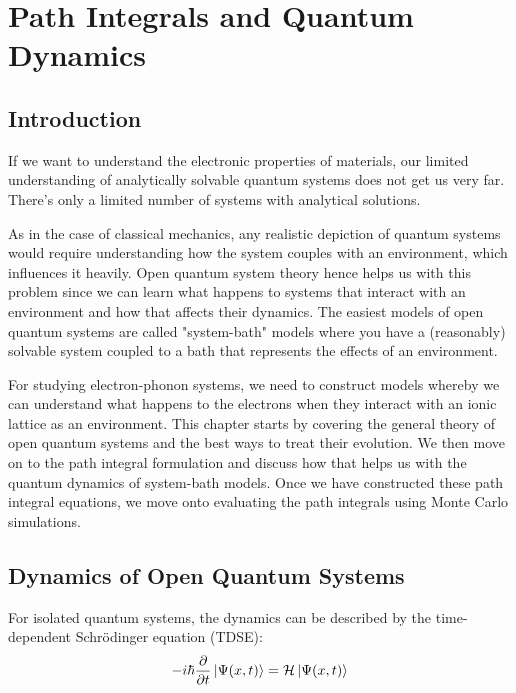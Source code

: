 \chapter{Path Integrals and Quantum Dynamics} %

\label{Chapter4} %



\section{Introduction}

If we want to understand the electronic properties of materials, our limited understanding of analytically solvable quantum systems does not get us very far. There's only a limited number of systems with analytical solutions.

As in the case of classical mechanics, any realistic depiction of quantum systems would require understanding how the system couples with an environment, which influences it heavily. Open quantum system theory hence helps us with this problem since we can learn what happens to systems that interact with an environment and how that affects their dynamics. The easiest models of open quantum systems are called "system-bath" models where you have a (reasonably) solvable system coupled to a bath that represents the effects of an environment.

For studying electron-phonon systems, we need to construct models whereby we can understand what happens to the electrons when they interact with an ionic lattice as an environment. This chapter starts by covering the general theory of open quantum systems and the best ways to treat their evolution. We then move on to the path integral formulation and discuss how that helps us with the quantum dynamics of system-bath models. Once we have constructed these path integral equations, we move onto evaluating the path integrals using Monte Carlo simulations. 


\section{Dynamics of Open Quantum Systems}

For isolated quantum systems, the dynamics can be described by the time-dependent Schr{\"o}dinger equation (TDSE): \begin{equation}\label{4.1} -i\hbar \frac{\partial}{\partial t} \ket{\Psi(x, t)} = \mathcal{H} \ket{\Psi(x, t)}\end{equation}

